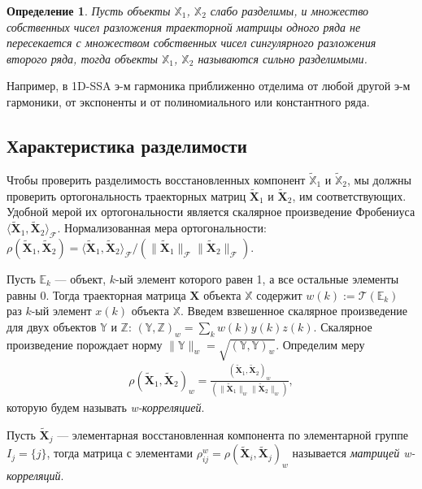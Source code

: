 \documentclass[specialist,
               substylefile = spbu.rtx,
               subf,href,colorlinks=true, 12pt]{disser}
\newtheorem{defn}{Определение}
\begin{document}
\begin{defn}
Пусть объекты $\mathbb{X}_1$,  $\mathbb{X}_2$ слабо разделимы, и множество собственных чисел разложения
 траекторной матрицы одного ряда не пересекается с множеством собственных чисел сингулярного разложения второго ряда, 
 тогда объекты $\mathbb{X}_1$,  $\mathbb{X}_2$ называются \emph{сильно разделимыми}. 
\end{defn}

Например, в 1D-SSA э-м гармоника приближенно отделима от любой другой э-м гармоники, от экспоненты и от полиномиального или константного ряда. 

\subsection{Характеристика разделимости}
\label{sec:sep}
Чтобы проверить разделимость восстановленных компонент $\widetilde{\mathbb{X}}_1$ и $\widetilde{\mathbb{X}}_2$, мы должны проверить ортогональность траекторных матриц $\widetilde{\mathbf{X}}_{1}$ и $\widetilde{\mathbf{X}}_{2}$, им соответствующих. Удобной мерой их ортогональности является скалярное произведение Фробениуса $\langle \widetilde{\mathbf{X}}_{1}, \widetilde{\mathbf{X}}_{2}\rangle_\mathcal{F}$. Нормализованная мера ортогональности: $\rho(\widetilde{\mathbf{X}}_{1}, \widetilde{\mathbf{X}}_{2}) = \langle \widetilde{\mathbf{X}}_{1}, \widetilde{\mathbf{X}}_{2}\rangle_\mathcal{F}/ \left( \| \widetilde{\mathbf{X}}_{1} \|_{\mathcal{F}} \|\widetilde{\mathbf{X}}_{2}\|_{\mathcal{F}} \right)$.

Пусть $\mathbb{E}_k$ --- объект, $k$-ый элемент которого равен 1, а все остальные элементы равны 0. Тогда траекторная матрица $\mathbf{X}$ объекта $\mathbb{X}$ содержит $w(k) := \mathcal{T}(\mathbb{E}_k)$ раз $k$-ый элемент $x(k)$ объекта $\mathbb{X}$. Введем взвешенное скалярное произведение для двух объектов $\mathbb{Y}$ и $\mathbb{Z}$: $(\mathbb{Y}, \mathbb{Z})_w = \sum_k w(k) y(k) z(k)$. Скалярное произведение порождает норму $\|\mathbb{Y}\|_w=\sqrt{(\mathbb{Y}, \mathbb{Y})_w}$. Определим меру
\begin{gather*}
\rho(\widetilde{\mathbf{X}}_{1}, \widetilde{\mathbf{X}}_{2})_w = \frac{\left( \widetilde{\mathbf{X}}_{1}, \widetilde{\mathbf{X}}_{2}\right)_w }{\left( \| \widetilde{\mathbf{X}}_{1} \|_w \|\widetilde{\mathbf{X}}_{2}\|_w \right)},
\end{gather*}
которую будем называть \textit{w-корреляцией}.

Пусть $ \widetilde{\mathbf{X}}_{j}$ --- элементарная восстановленная компонента по элементарной группе $I_j = \{j\}$, тогда матрица с элементами $\rho_{ij}^{w} = \rho(\widetilde{\mathbf{X}}_{i}, \widetilde{\mathbf{X}}_{j})_w$ называется \textit{матрицей w-корреляций}.
\end{document}
